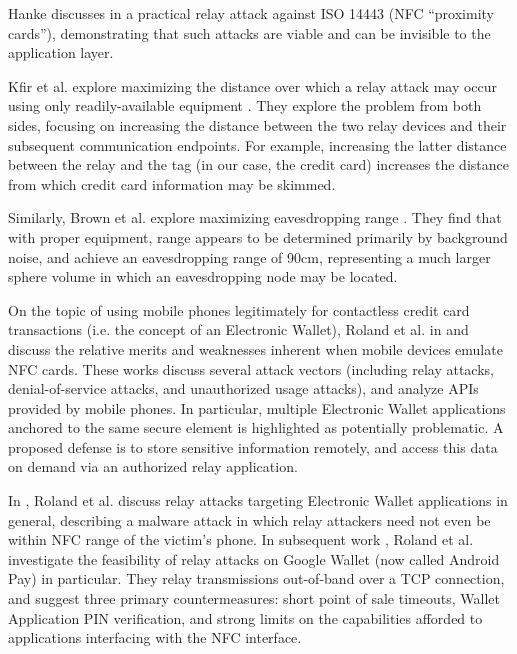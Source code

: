 
Hanke discusses in \cite{hancke2005practical} a practical relay attack against ISO 14443 (NFC ``proximity cards''),
    demonstrating that such attacks are viable and can be invisible to the application layer.

Kfir et al. explore maximizing the distance over which a relay attack may occur using only readily-available equipment \cite{kfir2005picking}.
    They explore the problem from both sides, focusing on increasing the distance between the two relay devices and their subsequent communication endpoints.
For example, increasing the latter distance between the relay and the tag (in our case, the credit card)
    increases the distance from which credit card information may be skimmed.

Similarly, Brown et al. explore maximizing eavesdropping range \cite{brown2013evaluating}.
They find that with proper equipment, range appears to be determined primarily by background noise,
    and achieve an eavesdropping range of 90cm, representing a much larger sphere volume in which an eavesdropping node may be located.


On the topic of using mobile phones legitimately for contactless credit card transactions (i.e. the concept of an Electronic Wallet),
    Roland et al. in \cite{roland2012software} and \cite{roland2012practical} discuss the relative merits and weaknesses inherent when mobile devices emulate NFC cards.
These works discuss several attack vectors (including relay attacks, denial-of-service attacks, and unauthorized usage attacks),
    and analyze APIs provided by mobile phones.
In particular, multiple Electronic Wallet applications anchored to the same secure element is highlighted as potentially problematic.
A proposed defense is to store sensitive information remotely, and access this data on demand via an authorized relay application.

In \cite{roland2012relay}, Roland et al. discuss relay attacks targeting Electronic Wallet applications in general,
    describing a malware attack in which relay attackers need not even be within NFC range of the victim's phone.
In subsequent work \cite{roland2013applying}, Roland et al. investigate the feasibility of relay attacks on Google Wallet (now called Android Pay) in particular.
They relay transmissions out-of-band over a TCP connection, and suggest three primary countermeasures:
    short point of sale timeouts, Wallet Application PIN verification, and strong limits on the capabilities afforded to applications interfacing with the NFC interface.

